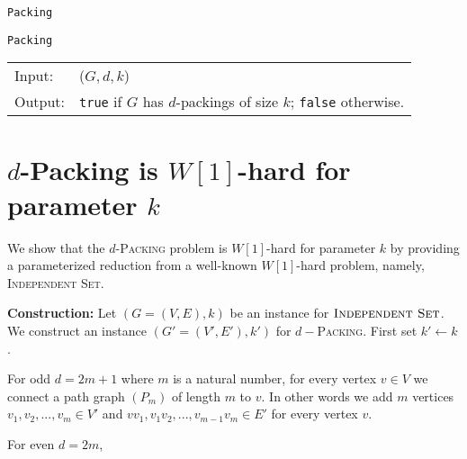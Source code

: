 \documentclass[10pt, a4paper]{article}
\theoremstyle{definition}
\newcommand{\n}{\\}
\begin{document}
\begin{algorithm}[H]
\caption{\texttt{Packing}}          %
\label{algo:packing} 
\texttt{Packing}\n
\begin{tabular}{l l}
 Input:  & ($G, d, k$) \n
 Output: & \texttt{true} if $G$ has $d$-packings of size $k$; \texttt{false} otherwise. \n
\end{tabular}	

\end{algorithm}

\clearpage
\section{$d$-\sc Packing \textnormal{is $W[1]$-hard for parameter $k$}}


We show that the $d$-\textsc{Packing} problem is $W[1]$-hard for parameter $k$ by providing a parameterized reduction from a well-known $W[1]$-hard problem, namely, \textsc{Independent Set}.	

\textbf{Construction:} Let $(G = (V,E) ,k)$ be an instance for $\textsc{Independent Set}$. We construct an instance $(G' = (V',E'),k')$ for $d-$\textsc{Packing}. First set $k' \leftarrow k$. 

For odd $d = 2m+1$ where $m$ is a natural number, for every vertex $v \in V$ we connect a path graph $(P_m)$ of length $m$ to $v$. In other words we add $m$ vertices $v_1, v_2, ..., v_m \in V'$ and $vv_1, v_1v_2,...,v_{m-1}v_m \in E'$ for every vertex $v$.


For even $d = 2m$,

\end{document}
